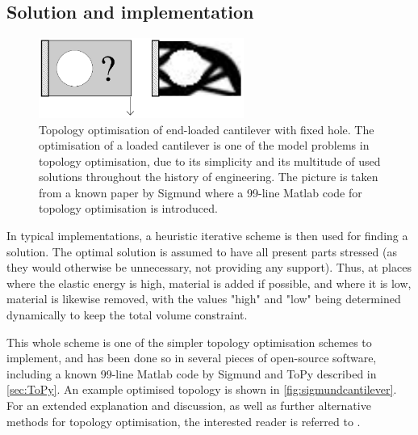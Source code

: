\subsection{Solution and implementation}
\begin{figure}
\centering
\includegraphics[width=0.6\textwidth]{Pictures/TopOp/Sigmund_cantilever2d.png}
\caption{Topology optimisation of end-loaded cantilever with fixed hole. The optimisation of a loaded cantilever is one of the model problems in topology optimisation, due to its simplicity and its multitude of used solutions throughout the history of engineering. The picture is taken from a known paper by Sigmund \cite{sigmund200199} where a 99-line Matlab code for topology optimisation is introduced.} 
\label{fig:sigmundcantilever}
\end{figure}
In typical implementations, a heuristic iterative scheme is then used for finding a solution. The optimal solution is assumed to have all present parts stressed (as they would otherwise be unnecessary, not providing any support). Thus, at places where the elastic energy is high, material is added if possible, and where it is low, material is likewise removed, with the values "high" and "low" being determined dynamically to keep the total volume constraint. 

This whole scheme is one of the simpler topology optimisation schemes to implement, and has been done so in several pieces of open-source software, including a known 99-line Matlab code by Sigmund \cite{sigmund200199} and ToPy described in \autoref{sec:ToPy}. An example optimised topology is shown in \autoref{fig:sigmundcantilever}. For an extended explanation and discussion, as well as further alternative methods for topology optimisation, the interested reader is referred to \cite{bendsoe2003topology}.

